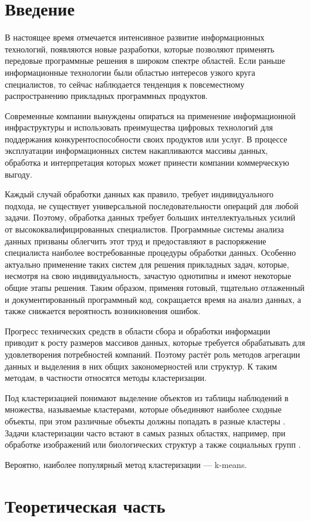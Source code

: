 \documentclass[12pt]{diploma}
\begin{document}
	\begin{titlepage}
		
	\end{titlepage}
	
	\tableofcontents 
	
	\newpage
	
	\section{Введение}
		В настоящее время отмечается интенсивное развитие информационных технологий, появляются новые разработки, которые позволяют применять передовые программные решения в широком спектре областей. Если раньше информационные технологии были областью интересов узкого круга специалистов, то сейчас наблюдается тенденция к повсеместному распространению прикладных программных продуктов. 
		
		Современные компании вынуждены опираться на применение информационной инфраструктуры и использовать преимущества цифровых технологий для поддержания конкурентоспособности своих продуктов или услуг. В процессе эксплуатации информационных систем накапливаются массивы данных, обработка и интерпретация которых может принести компании коммерческую выгоду. 
		
		Каждый случай обработки данных как правило, требует индивидуального подхода, не существует универсальной последовательности операций для любой задачи. Поэтому, обработка данных требует больших интеллектуальных усилий от высококвалифицированных специалистов. Программные системы анализа данных призваны облегчить этот труд и предоставляют в распоряжение специалиста наиболее востребованные процедуры обработки данных. Особенно актуально применение таких систем для решения прикладных задач, которые, несмотря на свою индивидуальность, зачастую однотипны и имеют некоторые общие этапы решения. Таким образом, применяя готовый, тщательно отлаженный и документированный программный код, сокращается время на анализ данных, а также снижается вероятность возникновения ошибок. 

		Прогресс технических средств в области сбора и обработки информации приводит к росту размеров массивов данных, которые требуется обрабатывать для удовлетворения потребностей компаний. Поэтому растёт роль методов агрегации данных и выделения в них общих закономерностей или структур. К таким методам, в частности относятся методы кластеризации. 
		
		Под кластеризацией понимают выделение объектов из таблицы наблюдений в множества, называемые кластерами, которые объединяют наиболее сходные объекты, при этом различные объекты должны попадать в разные кластеры \cite{mirkin-ds}. Задачи кластеризации часто встают в самых разных областях, например, при обработке изображений или биологических структур а также социальных групп \cite{mirkin-clustering}.
		
		Вероятно, наиболее популярный метод кластеризации --- k-means.

		
	\section{Теоретическая часть}
	
	\newpage
	
	
\end{document}
